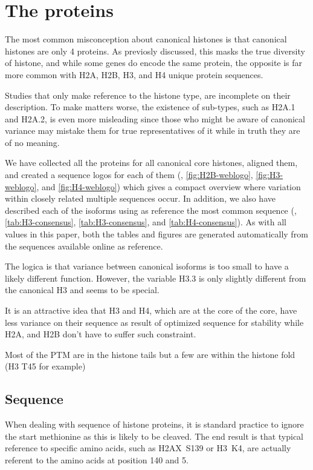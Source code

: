 \section{The proteins}

  The most common misconception about canonical histones is that canonical
  histones are only 4 proteins. As previosly discussed, this masks the true
  diversity of histone, and while some genes do encode the same protein, the
  opposite is far more common with \HTwoAUniqueProteins{} H2A,
  \HTwoBUniqueProteins{} H2B, \HThreeUniqueProteins{} H3, and
  \HFourUniqueProteins{} H4 unique protein sequences.

  Studies that only make reference to the histone type,
  are incomplete on their description. To make matters worse, the existence
  of sub-types, such as H2A.1 and H2A.2, is even more misleading since those
  who might be aware of canonical variance may mistake them for true
  representatives of it while in truth they are of no meaning.

  We have collected all the proteins for all canonical core histones, aligned
  them, and created a sequence logos for each of them (,
  \ref{fig:H2B-weblogo}, \ref{fig:H3-weblogo}, and \ref{fig:H4-weblogo}) which
  gives a compact overview where variation within closely related multiple
  sequences occur. In addition, we also have described each of the isoforms
  using as reference the most common sequence (,
  \ref{tab:H3-consensus}, \ref{tab:H3-consensus}, and \ref{tab:H4-consensus}).
  As with all values in this paper, both the tables and figures are generated
  automatically from the sequences available online as reference.


  The logica is that variance between canonical isoforms is too small to have a likely
  different function. However, the variable H3.3 is only slightly different from the
  canonical H3 and seems to be special.


  It is an attractive idea that H3 and H4, which are at the core of the core,
  have less variance on their sequence as result of optimized sequence for stability
  while H2A, and H2B don't have to suffer such constraint.

  Most of the PTM are in the histone tails but a few are within the histone fold (H3 T45 for example)

  \subsection{Sequence}
    When dealing with sequence of histone proteins, it is standard practice to
    ignore the start methionine as this is likely to be cleaved. The end
    result is that typical reference to specific amino acids, such as H2AX~S139
    or H3~K4, are actually referent to the amino acids at position 140 and 5.

